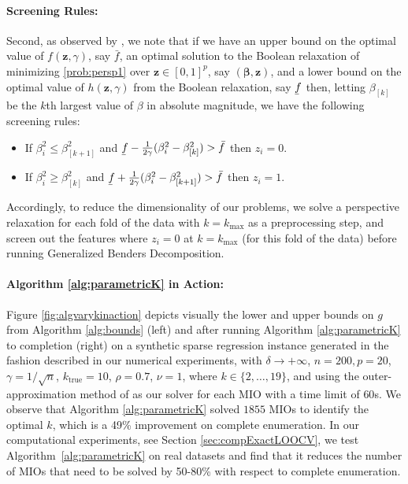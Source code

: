 \documentclass[opre,nonblindrev]{informs3} %
\begin{document}
\paragraph{Screening Rules:} Second, as observed by \cite{atamturk2020safe}, we note that if we have an upper bound on the optimal value of $f(\bm{z}, \gamma)$, say $\bar{f}$, 
an optimal solution to the Boolean relaxation of minimizing \eqref{prob:persp1} over $\bm{z} \in [0, 1]^p$, say $(\bm{\beta}, \bm{z})$, and a lower bound on the optimal value of $h(\bm{z}, \gamma)$ from the Boolean relaxation, say $\underaccent{\bar}{f}$
then, letting $\beta_{[k]}$ be the $k$th largest value of $\beta$ in absolute magnitude, we have the following screening rules:
    \begin{itemize}
        \item If $\beta_i^2 \leq \beta_{[k+1]}^2$ and $\underaccent{\bar}{f}-\frac{1}{2\gamma}(\beta^2_{i}-\beta^2_{[k]})>\bar{f}$ then $z_i=0$.
        \item If $\beta_i^2 \geq \beta_{[k]}^2$ and $\underaccent{\bar}{f}+\frac{1}{2\gamma}(\beta_{i}^2-\beta^2_{[k+1]})>\bar{f}$ then $z_i=1$.
    \end{itemize}
Accordingly, to reduce the dimensionality of our problems, we solve a perspective relaxation for each fold of the data with $k=k_{\max}$ as a preprocessing step, and screen out the features where $z_i=0$ at $k=k_{\max}$ (for this fold of the data) before running Generalized Benders Decomposition. 

\paragraph{Algorithm \ref{alg:parametricK} in Action: } Figure \ref{fig:algvarykinaction} depicts visually the lower and upper bounds on $g$ from Algorithm \ref{alg:bounds} (left) and after running Algorithm \ref{alg:parametricK} to completion (right) on a synthetic sparse regression instance generated in the fashion described in our numerical experiments, with $\delta \rightarrow +\infty$, $n=200, p=20$, $\gamma=1/\sqrt{n}$, $k_{\text{true}}=10$, $\rho=0.7$, $\nu=1$, where $k \in \{2, \ldots, 19\}$, and using the outer-approximation method of \cite{bertsimas2020sparse} as our solver for each MIO with a time limit of $60$s. We observe that Algorithm \ref{alg:parametricK} solved $1855$ MIOs to identify the optimal $k$, which is a 49\% improvement on complete enumeration. In our computational experiments, see Section \ref{sec:compExactLOOCV}, we test Algorithm~\ref{alg:parametricK} on real datasets and find that it reduces the number of MIOs that need to be solved by 50-80\% with respect to complete enumeration.
\end{document}
